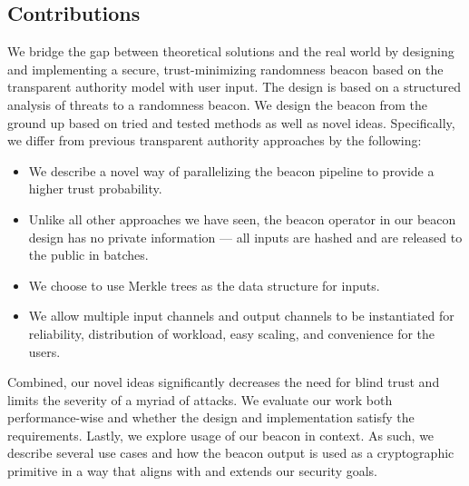 \subsection{Contributions}
We bridge the gap between theoretical solutions and the real world by designing and implementing a secure, trust-minimizing randomness beacon based on the transparent authority model with user input.
The design is based on a structured analysis of threats to a randomness beacon.
We design the beacon from the ground up based on tried and tested methods as well as novel ideas.
Specifically, we differ from previous transparent authority approaches by the following:
\begin{itemize}
    \item We describe a novel way of parallelizing the beacon pipeline to provide a higher trust probability.
    \item Unlike all other approaches we have seen, the beacon operator in our beacon design has no private information --- all inputs are hashed and are released to the public in batches.
    \item We choose to use Merkle trees as the data structure for inputs.
    \item We allow multiple input channels and output channels to be instantiated for reliability, distribution of workload, easy scaling, and convenience for the users.
\end{itemize}
Combined, our novel ideas significantly decreases the need for blind trust and limits the severity of a myriad of attacks.
We evaluate our work both performance-wise and whether the design and implementation satisfy the requirements.
Lastly, we explore usage of our beacon in context. As such, we describe several use cases and how the beacon output is used as a cryptographic primitive in a way that aligns with and extends our security goals.
